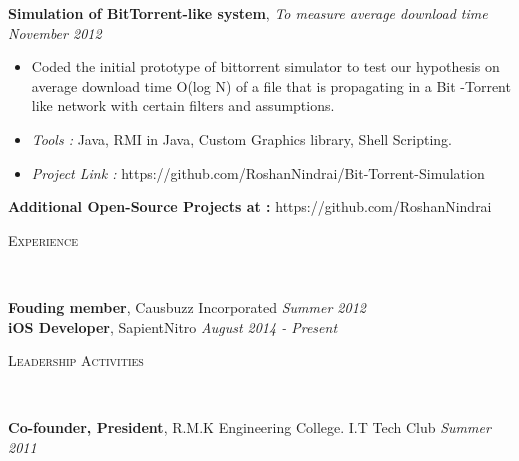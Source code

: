 \documentclass[9pt]{article}
\newenvironment{changemargin}[2]{%
  \begin{list}{}{%
    \setlength{\topsep}{0pt}%
    \setlength{\leftmargin}{#1}%
    \setlength{\rightmargin}{#2}%
    \setlength{\listparindent}{\parindent}%
    \setlength{\itemindent}{\parindent}%
    \setlength{\parsep}{\parskip}%
  }%
  \item[]}{\end{list}
}
\newcommand{\lineover}{
	\begin{changemargin}{-0.05in}{-0.05in}
		\vspace*{-8pt}
		\hrulefill \\
		\vspace*{-2pt}
	\end{changemargin}
}
\newcommand{\header}[1]{
	\begin{changemargin}{-0.5in}{-0.5in}
		\scshape{#1}\\
  	\lineover
	\end{changemargin}
}
\newenvironment{body} {
	\vspace*{-16pt}
	\begin{changemargin}{-0.25in}{-0.5in}
  }	
	{\end{changemargin}
}
\begin{document}
\begin{body}
\begin{itemize}
	\end{itemize}
\textbf {Simulation of BitTorrent-like system}, \emph{To measure average download time} \hfill \emph{November 2012}\\
	\vspace*{-4pt}
	\begin{itemize} \itemsep -0pt
		\item Coded the initial  prototype of bittorrent simulator to test our hypothesis on average download time O(log N) of a file that is propagating in a Bit -Torrent like network with certain filters and assumptions.
		\item \emph{Tools :} Java, RMI in Java, Custom Graphics library, Shell Scripting.
\item \emph{ Project Link :} https://github.com/RoshanNindrai/Bit-Torrent-Simulation
	
	\end{itemize}
\vspace*{+30pt}

\textbf {Additional Open-Source Projects at :} https://github.com/RoshanNindrai 
\end{body}
\smallskip



\header{Experience}

\begin{body}
	\vspace{14pt}
	\textbf{Fouding member}, Causbuzz Incorporated \hfill {}\emph{Summer 2012}\\
	\textbf{iOS  Developer}, SapientNitro \hfill {}\emph{August 2014 - Present}\\	
	\smallskip
	
\end{body}

\smallskip




\header{Leadership Activities}

\begin{body}
	\vspace{14pt}
	\textbf{Co-founder, President}, R.M.K Engineering College. I.T Tech Club \hfill {} \emph{Summer 2011}\\
	\smallskip
	
\end{body}
\end{document}
